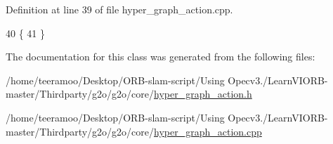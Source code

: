 Definition at line 39 of file hyper\+\_\+graph\+\_\+action.\+cpp.


\begin{DoxyCode}
40   \{
41   \}
\end{DoxyCode}


The documentation for this class was generated from the following files\+:\begin{DoxyCompactItemize}
\item 
/home/teeramoo/\+Desktop/\+O\+R\+B-\/slam-\/script/\+Using Opecv3./\+Learn\+V\+I\+O\+R\+B-\/master/\+Thirdparty/g2o/g2o/core/\hyperlink{hyper__graph__action_8h}{hyper\+\_\+graph\+\_\+action.\+h}\item 
/home/teeramoo/\+Desktop/\+O\+R\+B-\/slam-\/script/\+Using Opecv3./\+Learn\+V\+I\+O\+R\+B-\/master/\+Thirdparty/g2o/g2o/core/\hyperlink{hyper__graph__action_8cpp}{hyper\+\_\+graph\+\_\+action.\+cpp}\end{DoxyCompactItemize}
